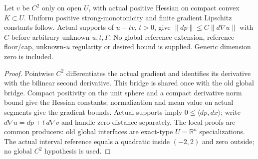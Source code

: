 \begin{lemma}
  \label{lem:compact-posDef-gradient-bounds}
  \leanok
  Let $v$ be $C^2$ only on open $U$, with actual positive Hessian on compact
  convex $K\subset U$. Uniform positive strong-monotonicity and finite gradient
  Lipschitz constants follow. Actual supports of $u-tv$, $t>0$, give
  $\|dp\|\le C\|d\nabla u\|$ with $C$ before arbitrary unknown $u,t,\Gamma$.
  No global reference extension, reference floor/cap, unknown-$u$ regularity
  or desired bound is supplied. Generic dimension zero is included.
\end{lemma}
\begin{proof}
  \leanok
  Pointwise $C^2$ differentiates the actual gradient and identifies its derivative
  with the bilinear second derivative. This bridge is shared once with the old
  global bridge. Compact positivity on the unit sphere and a compact derivative
  norm bound give the Hessian constants; normalization and mean value on actual
  segments give the gradient bounds. Actual supports imply
  $0\le\langle dp,dx\rangle$; write $d\nabla u=dp+t\,d\nabla v$ and handle
  zero distance separately. The local proofs are common producers: old global
  interfaces are exact-type $U=\mathbb R^n$ specializations. The actual interval
  reference equals a quadratic inside $(-2,2)$ and zero outside; no global $C^2$
  hypothesis is used.
\end{proof}

